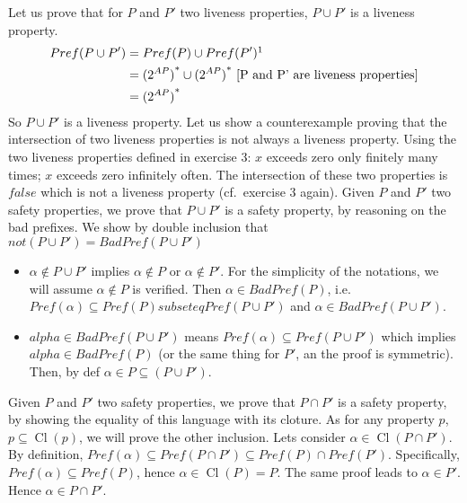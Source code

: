 \documentclass[11pt,a4paper]{article}
\DeclareMathOperator{\Cl}{Cl}
\begin{document}
\begin{Answer}
\Question%
Let us prove that for $P$ and $P'$ two liveness properties, $P \cup P'$ is a liveness property.
\begin{align*}Pref(P \cup P') &= Pref(P) \cup Pref(P')\footnotemark[1]\\
                              &= {(2^{AP})}^* \cup {(2^{AP})}^* \text{ [P and P' are liveness properties]}\\
                              &= {(2^{AP})}^*
\end{align*}
So $P \cup P'$ is a liveness property.
\Question%
Let us show a counterexample proving that the intersection of two liveness properties is not always a liveness property.
Using the two liveness properties defined in exercise 3: $x$ exceeds zero only finitely many times; $x$ exceeds zero infinitely often.
The intersection of these two properties is $false$ which is not a liveness property (cf.\ exercise 3 again).
\Question%
Given $P$ and $P'$ two safety properties, we prove that $P\cup P'$ is a safety property, by reasoning on the bad prefixes. We show by double inclusion that $ not( P\cup P') = BadPref( P\cup P')$
\begin{itemize}
\item $\alpha \notin P\cup P'$ implies $\alpha \notin P$ or $\alpha \notin P'$.
For the simplicity of the notations, we will assume $\alpha \notin P$ is verified. Then $\alpha \in BadPref(P)$, i.e. $Pref(\alpha) \subseteq Pref(P) subseteq Pref(P \cup P')$ and $\alpha \in BadPref(P \cup P')$.
\item $alpha \in BadPref(P\cup P')$ means $Pref(\alpha) \subseteq Pref(P \cup P')$ which implies $alpha \in BadPref(P)$ (or the same thing for $P'$, an the proof is symmetric). Then, by def $\alpha \in P \subseteq (P \cup P')$.
\end{itemize}
\Question%
Given $P$ and $P'$ two safety properties, we prove that $P\cap P'$ is a safety property, by showing the equality of this language with its cloture.
As for any property $p$, $p \subseteq \Cl(p)$, we will prove the other inclusion. Lets consider $\alpha \in \Cl(P\cap P')$. By definition, $Pref(\alpha) \subseteq Pref(P\cap P') \subseteq Pref(P) \cap Pref(P')$\footnotemark[2].
Specifically, $Pref(\alpha) \subseteq Pref(P)$, hence $\alpha \in \Cl(P) = P$. The same proof leads to $\alpha \in P'$. Hence $\alpha \in P\cap P'$.


\end{Answer}
\end{document}
